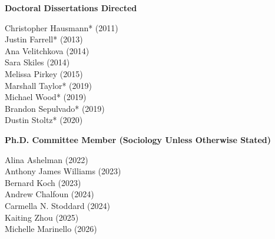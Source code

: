 
\noindent \textbf{Doctoral Dissertations Directed }

\begin{multicols}{2}
    \noindent
    Christopher Hausmann\textcolor{uclablue}{*} (2011) \\
    Justin Farrell\textcolor{uclablue}{*} (2013) \\
    Ana Velitchkova (2014) \\
    Sara Skiles (2014) \\
    Melissa Pirkey (2015) \\
    Marshall Taylor\textcolor{uclablue}{*} (2019) \\
    Michael Wood\textcolor{uclablue}{*} (2019) \\
    Brandon Sepulvado\textcolor{uclablue}{*} (2019) \\
    Dustin Stoltz\textcolor{uclablue}{*} (2020) 
\end{multicols}
\medskip

\medskip
\noindent \textbf{Ph.D. Committee Member (Sociology Unless Otherwise Stated)} 

\begin{multicols}{2} \noindent
    Alina Ashelman (2022) \\
    Anthony James Williams (2023) \\
    Bernard Koch (2023) \\
    Andrew Chalfoun (2024) \\
    Carmella N. Stoddard (2024) \\
    Kaiting Zhou (2025) \\
    Michelle Marinello (2026)
\end{multicols}

